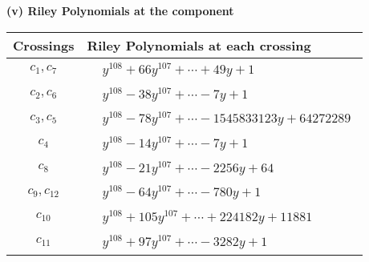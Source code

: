 \documentclass[1p]{elsarticle_modified}
\theoremstyle{definition}
\begin{document}
\newpage\renewcommand{\arraystretch}{1}
\flushleft \textbf{(v) Riley Polynomials at the component}\newline \\
\begin{tabular}{m{50pt}|m{274pt}}
Crossings & \hspace{64pt}Riley Polynomials at each crossing \\
\hline $$\begin{aligned}c_{1},c_{7}\end{aligned}$$&$\begin{aligned}
&y^{108}+66 y^{107}+\cdots+49 y+1
\end{aligned}$\\
\hline $$\begin{aligned}c_{2},c_{6}\end{aligned}$$&$\begin{aligned}
&y^{108}-38 y^{107}+\cdots-7 y+1
\end{aligned}$\\
\hline $$\begin{aligned}c_{3},c_{5}\end{aligned}$$&$\begin{aligned}
&y^{108}-78 y^{107}+\cdots-1545833123 y+64272289
\end{aligned}$\\
\hline $$\begin{aligned}c_{4}\end{aligned}$$&$\begin{aligned}
&y^{108}-14 y^{107}+\cdots-7 y+1
\end{aligned}$\\
\hline $$\begin{aligned}c_{8}\end{aligned}$$&$\begin{aligned}
&y^{108}-21 y^{107}+\cdots-2256 y+64
\end{aligned}$\\
\hline $$\begin{aligned}c_{9},c_{12}\end{aligned}$$&$\begin{aligned}
&y^{108}-64 y^{107}+\cdots-780 y+1
\end{aligned}$\\
\hline $$\begin{aligned}c_{10}\end{aligned}$$&$\begin{aligned}
&y^{108}+105 y^{107}+\cdots+224182 y+11881
\end{aligned}$\\
\hline $$\begin{aligned}c_{11}\end{aligned}$$&$\begin{aligned}
&y^{108}+97 y^{107}+\cdots-3282 y+1
\end{aligned}$\\
\hline
\end{tabular}\\~\\
\end{document}
